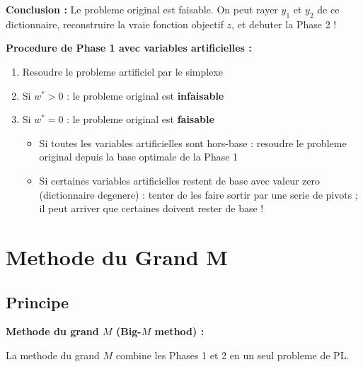 \documentclass[12pt,a4paper]{article}
\begin{document}
\textbf{Conclusion :} Le probleme original est faisable. On peut rayer $y_1$ et $y_2$ de ce dictionnaire, reconstruire la vraie fonction objectif $z$, et debuter la Phase 2 !
\begin{methode}
\textbf{Procedure de Phase 1 avec variables artificielles :}

\begin{enumerate}
    \item Resoudre le probleme artificiel par le simplexe
    \item Si $w^* > 0$ : le probleme original est \textcolor{importantrouge}{\textbf{infaisable}}
    \item Si $w^* = 0$ : le probleme original est \textcolor{defvert}{\textbf{faisable}}
    \begin{itemize}
        \item Si toutes les variables artificielles sont hors-base : resoudre le probleme original depuis la base optimale de la Phase 1
        \item Si certaines variables artificielles restent de base avec valeur zero (dictionnaire degenere) : tenter de les faire sortir par une serie de pivots ; il peut arriver que certaines doivent rester de base !
    \end{itemize}
\end{enumerate}
\end{methode}

\section{Methode du Grand M}

\subsection{Principe}

\begin{definition}
\textbf{Methode du grand $M$ (Big-$M$ method) :}

La methode du grand $M$ combine les Phases 1 et 2 en un seul probleme de PL.
\end{definition}
\end{document}
